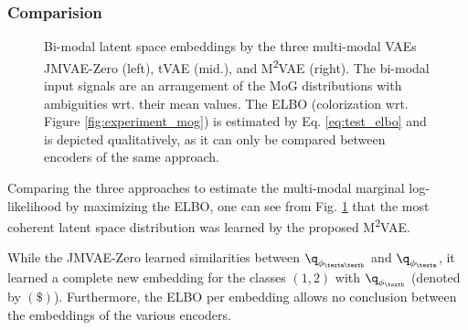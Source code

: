 \subsubsection{Comparision}
%
%	
%
\begin{figure}[h]
	\def\svgwidth{\textwidth}
	\tiny
	
	\caption{Bi-modal latent space embeddings by the three multi-modal VAEs JMVAE-Zero (left), tVAE (mid.), and M\textsuperscript{2}VAE (right). The bi-modal input signals are an arrangement of the MoG distributions with ambiguities wrt. their mean values. The ELBO (colorization wrt. Figure \ref{fig:experiment_mog}) is estimated by Eq. \ref{eq:test_elbo} and is depicted qualitatively, as it can only be compared between encoders of the same approach.}
	\label{fig:experiment_mog_2}
\end{figure}
%
%
%
Comparing the three approaches to estimate the multi-modal marginal log-likelihood by maximizing the ELBO, one can see from Fig. \ref{fig:experiment_mog_2} that the most coherent latent space distribution was learned by the proposed M\textsuperscript{2}VAE.

While the JMVAE-Zero learned similarities between $\q_{\phi_{\texta\textb}}$ and $\q_{\phi_{\texta}}$, it learned a complete new embedding for the classes $(1,2)$ with $\q_{\phi_{\textb}}$ (denoted by $(\$)$).
%
Furthermore, the ELBO per embedding allows no conclusion between the embeddings of the various encoders.
%

